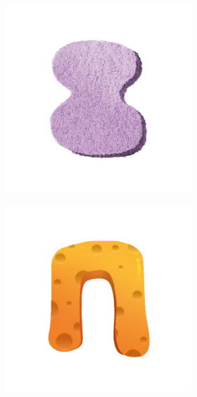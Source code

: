 \begin{figure}[h!]
\begin{center}
\begin{subfigure}[b]{0.15\textwidth}
\begin{center}
\begin{subfigure}[b]{0.9\textwidth}
                    \includegraphics[width=\linewidth]{figures/artist_objects/fake5_carpet_purple.jpg}
                \end{subfigure}
            \end{center}
        \end{subfigure}
        \begin{subfigure}[b]{0.15\textwidth}
            \begin{center}
                \begin{subfigure}[b]{0.9\textwidth}
                    \includegraphics[width=\linewidth]{figures/artist_objects/fake4_sponge_orange.jpg}

\end{subfigure}
\end{center}
\end{subfigure}
\end{center}
\end{figure}
